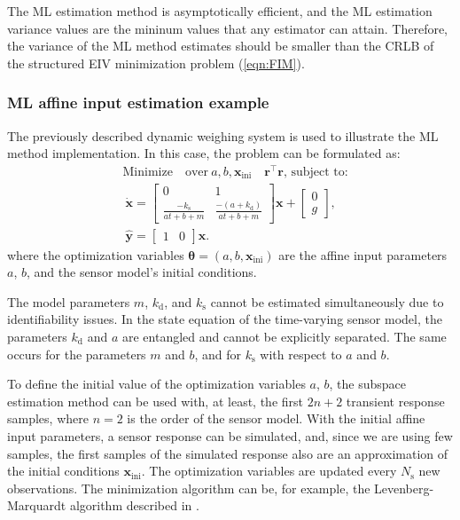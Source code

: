 The ML estimation method is asymptotically efficient, and the ML estimation variance values are the mininum values that any estimator can attain.
Therefore, the variance of the ML method estimates should be smaller than the CRLB of the structured EIV minimization problem (\ref{eqn:FIM}).

\subsubsection{ML affine input estimation example}

The previously described dynamic weighing system is used to illustrate the ML method implementation.
In this case, the problem can be formulated as: 
 \begin{equation} \begin{aligned}
     & \text{Minimize} \quad \text{over} \ a, b, \mathbf{x}_{\text{ini}} \quad \mathbf{r}^\top \mathbf{r} \text{, subject to:} \\ & \ \dot{\mathbf{x}} = \begin{bmatrix} 0 & 1 \\ \frac{-k_{\mathrm{s}}}{a t + b + m} & \frac{-(a + k_{\mathrm{d}})}{a t + b + m} \end{bmatrix} \mathbf{x} + \begin{bmatrix} 0 \\ g \end{bmatrix}, \\ & \ \widehat{\mathbf{y}} = \begin{bmatrix} 1 & 0  \end{bmatrix} \mathbf{x} .  
 \label{eqn:ltv_abxini} \end{aligned} \end{equation}
where the optimization variables $\bm{\theta} = \left(a, b, \mathbf{x}_{\mathrm{ini}} \right)$ are the affine input parameters $a$, $b$, and the sensor model's initial conditions.

The model parameters $m$, $k_{\mathrm{d}}$, and $k_{\mathrm{s}}$ cannot be estimated simultaneously due to identifiability issues.
In the state equation of the time-varying sensor model, the parameters $k_{\mathrm{d}}$ and $a$ are entangled and cannot be explicitly separated.
The same occurs for the parameters $m$ and $b$, and for $k_{\mathrm{s}}$ with respect to $a$ and $b$.

To define the initial value of the optimization variables $a$, $b$,
the subspace estimation method can be used with, at least, the first $2n+2$ transient response samples, where $n=2$ is the order of the sensor model.
With the initial affine input parameters, a sensor response can be simulated, and, since we are using few samples, the first samples of the simulated response also are an approximation of the initial conditions $\mathbf{x}_{\mathrm{ini}}$.
The optimization variables are updated every $N_{\mathrm{s}}$ new observations.
The minimization algorithm can be, for example, the Levenberg-Marquardt algorithm described in \citet{Nocedal06}. 

